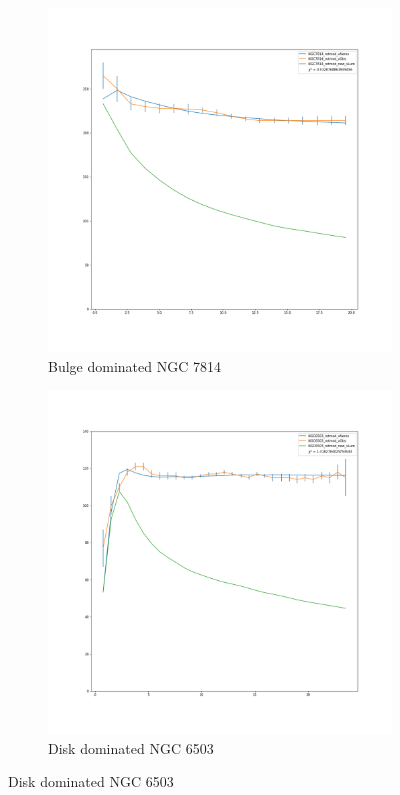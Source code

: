 \documentclass[reprint,%
 amsmath,amssymb,
 aps,
]{revtex4-1}
\begin{document}
\begin{figure}[ht] 
  \begin{subfigure}[b]{0.5\linewidth}
    \centering
    \includegraphics[width=0.75\linewidth]{figures/NGC7814_rotmod_XueSofue.png} 
    \caption{Bulge dominated NGC 7814} 
    \label{fig7:a} 
    \vspace{4ex}
  \end{subfigure}%
  \begin{subfigure}[b]{0.5\linewidth}
    \centering
    \includegraphics[width=0.75\linewidth]{figures/NGC6503_rotmod_XueSofue.png} 
    \caption{Disk dominated NGC 6503} 
    \label{fig7:b} 
    \vspace{4ex}
  \end{subfigure} 

\end{figure}
\end{document}

